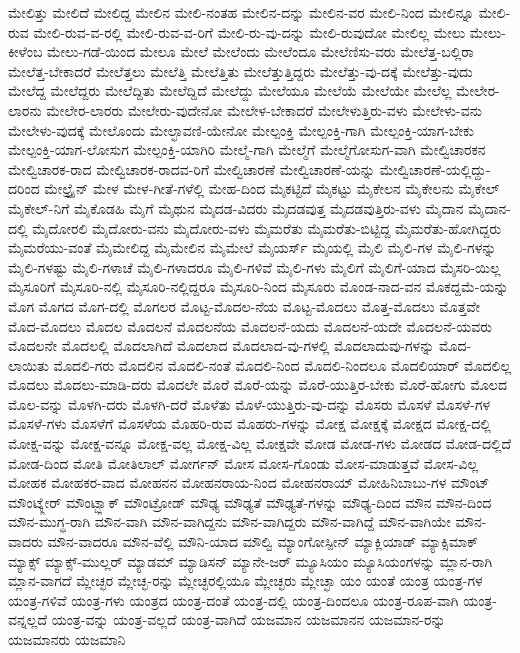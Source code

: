 {ಮೇಲಿತ್ತು
ಮೇಲಿದೆ
ಮೇಲಿದ್ದ
ಮೇಲಿನ
ಮೇಲಿ-ನಂತಹ
ಮೇಲಿನ-ದನ್ನು
ಮೇಲಿನ-ವರ
ಮೇಲಿ-ನಿಂದ
ಮೇಲಿನ್ನೂ
ಮೇಲಿ-ರುವ
ಮೇಲಿ-ರುವ-ವ-ರಲ್ಲಿ
ಮೇಲಿ-ರುವ-ವ-ರಿಗೆ
ಮೇಲಿ-ರು-ವು-ದನ್ನು
ಮೇಲಿ-ರುವುದೋ
ಮೇಲಿಲ್ಲ
ಮೇಲು
ಮೇಲು-ಕೀಳೆಂಬ
ಮೇಲು-ಗಡೆ-ಯಿಂದ
ಮೇಲೂ
ಮೇಲೆ
ಮೇಲೆಂದು
ಮೇಲೆಂದೂ
ಮೇಲೆಣಿಸು-ವರು
ಮೇಲೆತ್ತ-ಬಲ್ಲಿರಾ
ಮೇಲೆತ್ತ-ಬೇಕಾದರೆ
ಮೇಲೆತ್ತಲು
ಮೇಲೆತ್ತಿ
ಮೇಲೆತ್ತಿತು
ಮೇಲೆತ್ತುತ್ತಿದ್ದರು
ಮೇಲೆತ್ತು-ವು-ದಕ್ಕೆ
ಮೇಲೆತ್ತು-ವುದು
ಮೇಲೆದ್ದ
ಮೇಲೆದ್ದರು
ಮೇಲೆದ್ದಿತು
ಮೇಲೆದ್ದಿದೆ
ಮೇಲೆದ್ದು
ಮೇಲೆಯೂ
ಮೇಲೆಯೆ
ಮೇಲೆಯೇ
ಮೇಲೆಲ್ಲ
ಮೇಲೇರ-ಲಾರನು
ಮೇಲೇರ-ಲಾರರು
ಮೇಲೇರು-ವುದೇನೋ
ಮೇಲೇಳ-ಬೇಕಾದರೆ
ಮೇಲೇಳುತ್ತಿರು-ವಳು
ಮೇಲೇಳು-ವನು
ಮೇಲೇಳು-ವುದಕ್ಕೆ
ಮೇಲೊಂದು
ಮೇಲ್ಛಾವಣಿ-ಯೇನೋ
ಮೇಲ್ಪಂಕ್ತಿ
ಮೇಲ್ಪಂಕ್ತಿ-ಗಾಗಿ
ಮೇಲ್ಪಂಕ್ತಿ-ಯಾಗ-ಬೇಕು
ಮೇಲ್ಪಂಕ್ತಿ-ಯಾಗ-ಲೋಸುಗ
ಮೇಲ್ಪಂಕ್ತಿ-ಯಾಗಿರಿ
ಮೇಲ್ಮೆ-ಗಾಗಿ
ಮೇಲ್ಮೆಗೆ
ಮೇಲ್ಮೆಗೋಸುಗ-ವಾಗಿ
ಮೇಲ್ವಿಚಾರಕನ
ಮೇಲ್ವಿಚಾರಕ-ರಾದ
ಮೇಲ್ವಿಚಾರಕ-ರಾದವ-ರಿಗೆ
ಮೇಲ್ವಿಚಾರಣೆ
ಮೇಲ್ವಿಚಾರಣೆ-ಯನ್ನು
ಮೇಲ್ವಿಚಾರಣೆ-ಯಲ್ಲಿದ್ದು-ದರಿಂದ
ಮೇಲ್ಟ್ರೈನ್
ಮೇಳ
ಮೇಳ-ಗೀತೆ-ಗಳೆಲ್ಲಿ
ಮೇಹ-ದಿಂದ
ಮೈಕಟ್ಟಿದೆ
ಮೈಕಟ್ಟು
ಮೈಕೇಲನ
ಮೈಕೇಲನು
ಮೈಕೇಲ್
ಮೈಕೇಲ್-ನಿಗೆ
ಮೈಕೊಡಹಿ
ಮೈಗೆ
ಮೈಥುನ
ಮೈದಡ-ವಿದರು
ಮೈದಡವುತ್ತ
ಮೈದಡವುತ್ತಿರು-ವಳು
ಮೈದಾನ
ಮೈದಾನ-ದಲ್ಲಿ
ಮೈದೋರಲಿ
ಮೈದೋರು-ವನು
ಮೈದೋರು-ವಳು
ಮೈಮರೆತು
ಮೈಮರೆತು-ಬಿಟ್ಟಿದ್ದ
ಮೈಮರೆತು-ಹೋಗಿದ್ದರು
ಮೈಮರೆಯು-ವಂತೆ
ಮೈಮೇಲಿದ್ದ
ಮೈಮೇಲಿನ
ಮೈಮೇಲೆ
ಮೈಯರ್ಸ್
ಮೈಯಲ್ಲಿ
ಮೈಲಿ
ಮೈಲಿ-ಗಳ
ಮೈಲಿ-ಗಳನ್ನು
ಮೈಲಿ-ಗಳಷ್ಟು
ಮೈಲಿ-ಗಳಾಚೆ
ಮೈಲಿ-ಗಳಾದರೂ
ಮೈಲಿ-ಗಳಿವೆ
ಮೈಲಿ-ಗಳು
ಮೈಲಿಗೆ
ಮೈಲಿಗೆ-ಯಾದ
ಮೈಸರಿ-ಯಿಲ್ಲ
ಮೈಸೂರಿಗೆ
ಮೈಸೂರಿ-ನಲ್ಲಿ
ಮೈಸೂರಿ-ನಲ್ಲಿದ್ದರೂ
ಮೈಸೂರಿ-ನಿಂದ
ಮೈಸೂರು
ಮೊಂಡ-ನಾದ-ವನ
ಮೊಕದ್ದಮೆ-ಯನ್ನು
ಮೊಗ
ಮೊಗದ
ಮೊಗ-ದಲ್ಲಿ
ಮೊಗಲರ
ಮೊಟ್ಟ-ಮೊದಲ-ನೆಯ
ಮೊಟ್ಟ-ಮೊದಲು
ಮೊತ್ತ-ಮೊದಲು
ಮೊತ್ತವೇ
ಮೊದ-ಮೊದಲು
ಮೊದಲ
ಮೊದಲನೆ
ಮೊದಲನೆಯ
ಮೊದಲನೆ-ಯದು
ಮೊದಲನೆ-ಯದೇ
ಮೊದಲನೆ-ಯವರು
ಮೊದಲನೇ
ಮೊದಲಲ್ಲಿ
ಮೊದಲಾಗಿದೆ
ಮೊದಲಾದ
ಮೊದಲಾದ-ವು-ಗಳಲ್ಲಿ
ಮೊದಲಾದುವು-ಗಳನ್ನು
ಮೊದ-ಲಾಯಿತು
ಮೊದಲಿ-ಗರು
ಮೊದಲಿನ
ಮೊದಲಿ-ನಂತೆ
ಮೊದಲಿ-ನಿಂದ
ಮೊದಲಿ-ನಿಂದಲೂ
ಮೊದಲಿಯಾರ್
ಮೊದಲಿಲ್ಲ
ಮೊದಲು
ಮೊದಲು-ಮಾಡಿ-ದರು
ಮೊದಲೇ
ಮೊರೆ
ಮೊರೆ-ಯನ್ನು
ಮೊರೆ-ಯುತ್ತಿರ-ಬೇಕು
ಮೊರೆ-ಹೋಗು
ಮೊಲದ
ಮೊಲ-ವನ್ನು
ಮೊಳಗಿ-ದರು
ಮೊಳಗಿ-ದರೆ
ಮೊಳೆತು
ಮೊಳೆ-ಯುತ್ತಿರು-ವು-ದನ್ನು
ಮೊಸರು
ಮೊಸಳೆ
ಮೊಸಳೆ-ಗಳ
ಮೊಸಳೆ-ಗಳು
ಮೊಸಳೆಗೆ
ಮೊಸಳೆಯ
ಮೊಹರಿ-ರುವ
ಮೊಹರು-ಗಳನ್ನು
ಮೋಕ್ಷ
ಮೋಕ್ಷಕ್ಕೆ
ಮೋಕ್ಷದ
ಮೋಕ್ಷ-ದಲ್ಲಿ
ಮೋಕ್ಷ-ವನ್ನು
ಮೋಕ್ಷ-ವನ್ನೂ
ಮೋಕ್ಷ-ವಲ್ಲ
ಮೋಕ್ಷ-ವಿಲ್ಲ
ಮೋಕ್ಷವೇ
ಮೋಡ
ಮೋಡ-ಗಳು
ಮೋಡದ
ಮೋಡ-ದಲ್ಲಿದೆ
ಮೋಡ-ದಿಂದ
ಮೋತಿ
ಮೋತಿಲಾಲ್
ಮೋರ್ಗನ್
ಮೋಸ
ಮೋಸ-ಗೊಂಡು
ಮೋಸ-ಮಾಡುತ್ತವೆ
ಮೋಸ-ವಿಲ್ಲ
ಮೋಹಕ
ಮೋಹಕರ-ವಾದ
ಮೋಹನನ
ಮೋಹನರಾಯ-ನಿಂದ
ಮೋಹನರಾಯ್
ಮೋಹಿನಿಬಾಬು-ಗಳ
ಮೌಂಟ್
ಮೌಂಟ್ಕ್ಲೇರ್
ಮೌಂಟ್ಬ್ಲಾಕ್
ಮೌಂಟ್ರೋಡ್
ಮೌಢ್ಯ
ಮೌಢ್ಯತೆ
ಮೌಢ್ಯತೆ-ಗಳನ್ನು
ಮೌಢ್ಯ-ದಿಂದ
ಮೌನ
ಮೌನ-ದಿಂದ
ಮೌನ-ಮುಗ್ಧ-ರಾಗಿ
ಮೌನ-ವಾಗಿ
ಮೌನ-ವಾಗಿದ್ದನು
ಮೌನ-ವಾಗಿದ್ದರು
ಮೌನ-ವಾಗಿದ್ದೆ
ಮೌನ-ವಾಗಿಯೇ
ಮೌನ-ವಾದರು
ಮೌನ-ವಾದರೂ
ಮೌನ-ವೆಲ್ಲಿ
ಮೌನಿ-ಯಾದ
ಮೌಲ್ವಿ
ಮ್ಯಾಂಗೋಸ್ಪೀನ್
ಮ್ಯಾಕ್ಲಿಯಾಡ್
ಮ್ಯಾಕ್ಸಿಮಾಕ್
ಮ್ಯಾಕ್ಸ್
ಮ್ಯಾಕ್ಸ್-ಮುಲ್ಲರ್
ಮ್ಯಾಡಮ್
ಮ್ಯಾಡಿಸನ್
ಮ್ಯಾನೇ-ಜರ್
ಮ್ಯೂಸಿಯಂ
ಮ್ಯೂಸಿಯಂಗಳನ್ನು
ಮ್ಲಾನ-ರಾಗಿ
ಮ್ಲಾನ-ವಾಗದೆ
ಮ್ಲೇಚ್ಛರ
ಮ್ಲೇಚ್ಛ-ರನ್ನು
ಮ್ಲೇಚ್ಛರಲ್ಲಿಯೂ
ಮ್ಲೇಚ್ಛರು
ಮ್ಲೇಚ್ಛಾ
ಯಂ
ಯಂತೆ
ಯಂತ್ರ
ಯಂತ್ರ-ಗಳ
ಯಂತ್ರ-ಗಳಿವೆ
ಯಂತ್ರ-ಗಳು
ಯಂತ್ರದ
ಯಂತ್ರ-ದಂತೆ
ಯಂತ್ರ-ದಲ್ಲಿ
ಯಂತ್ರ-ದಿಂದಲೂ
ಯಂತ್ರ-ರೂಪ-ವಾಗಿ
ಯಂತ್ರ-ವನ್ನಲ್ಲದೆ
ಯಂತ್ರ-ವನ್ನು
ಯಂತ್ರ-ವಲ್ಲದೆ
ಯಂತ್ರ-ವಾಗಿದೆ
ಯಜಮಾನ
ಯಜಮಾನನ
ಯಜಮಾನ-ರನ್ನು
ಯಜಮಾನರು
ಯಜಮಾನಿ
}
